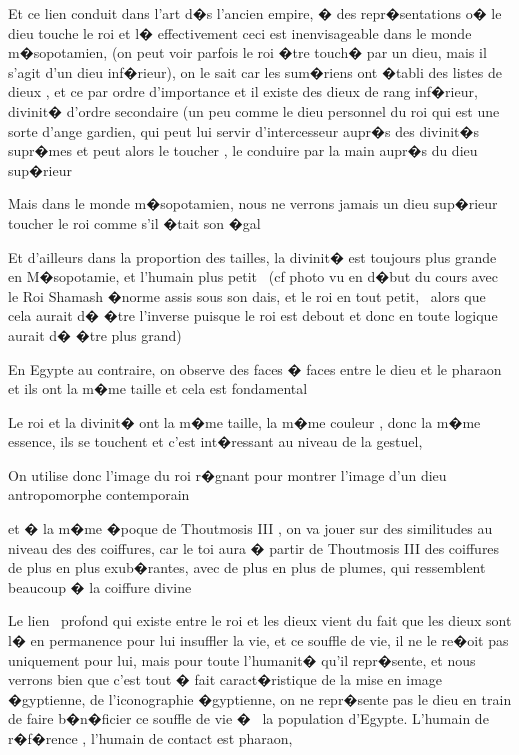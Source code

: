 \documentclass{article}
\begin{document}
\bigskip


\bigskip


\bigskip


\bigskip


\bigskip


\bigskip


\bigskip

Et ce lien conduit dans l'art d�s l'ancien empire, � des repr�sentations o� le dieu touche le roi et l� effectivement ceci est inenvisageable dans le monde m�sopotamien, (on peut voir parfois le roi �tre touch� par un dieu, mais il s'agit d'un dieu inf�rieur), on le sait car les sum�riens ont �tabli des listes de dieux , et ce par ordre d'importance et il existe des dieux de rang inf�rieur, divinit� d'ordre secondaire (un peu comme le dieu personnel du roi qui est une sorte d'ange gardien, qui peut lui servir d'intercesseur aupr�s des divinit�s supr�mes et peut alors le toucher , le conduire par la main aupr�s du dieu sup�rieur

Mais dans le monde m�sopotamien, nous ne verrons jamais un dieu sup�rieur toucher le roi comme s'il �tait son �gal


\bigskip

Et d'ailleurs dans la proportion des tailles, la divinit� est toujours plus grande en M�sopotamie, et l'humain plus petit \ (cf photo vu en d�but du cours avec le Roi Shamash �norme assis sous son dais, et le roi en tout petit, \ alors que cela aurait d� �tre l'inverse puisque le roi est debout et donc en toute logique aurait d� �tre plus grand)


\bigskip


\bigskip

En Egypte au contraire, on observe des faces � faces entre le dieu et le pharaon et ils ont la m�me taille et cela est fondamental 

Le roi et la divinit� ont la m�me taille, la m�me couleur , donc la m�me essence, ils se touchent et c'est int�ressant au niveau de la gestuel, 

On utilise donc l'image du roi r�gnant pour montrer l'image d'un dieu antropomorphe contemporain

et � la m�me �poque de Thoutmosis III , on va jouer sur des similitudes au niveau des des coiffures, car le toi aura � partir de Thoutmosis III des coiffures de plus en plus exub�rantes, avec de plus en plus de plumes, qui ressemblent beaucoup � la coiffure divine


\bigskip

Le lien \ profond qui existe entre le roi et les dieux vient du fait que les dieux sont l� en permanence pour lui insuffler la vie, et ce souffle de vie, il ne le re�oit pas uniquement pour lui, mais pour toute l'humanit� qu'il repr�sente, et nous verrons bien que c'est tout � fait caract�ristique de la mise en image �gyptienne, de l'iconographie �gyptienne, on ne repr�sente pas le dieu en train de faire b�n�ficier ce souffle de vie � \ la population d'Egypte. L'humain de r�f�rence , l'humain de contact est pharaon, 
\end{document}
